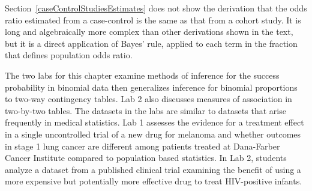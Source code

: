 Section~\ref{caseControlStudiesEstimates} does not show the derivation that the odds ratio estimated from a case-control is the same as that from a cohort study. It is long and algebraically more complex than other derivations shown in the text, but it is a direct application of Bayes' rule, applied to each term in the fraction that defines population odds ratio.

The two labs for this chapter examine methods of inference for the success probability in binomial data then generalizes inference for binomial proportions to two-way contingency tables.  Lab 2 also discusses measures of association in two-by-two tables.  The datasets in the labs are similar to datasets that arise frequently in medical statistics.  Lab 1 assesses the evidence for a treatment effect in a single uncontrolled trial of a new drug for melanoma and whether outcomes in stage 1 lung cancer are different among patients treated at Dana-Farber Cancer Institute compared to population based statistics. In Lab 2, students analyze a dataset from a published clinical trial examining the benefit of using a more expensive but potentially more effective drug to treat HIV-positive infants.
